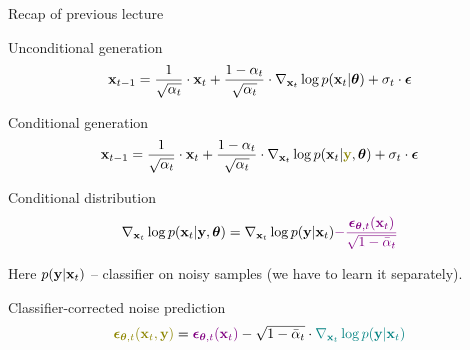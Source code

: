 \begin{frame}{Recap of previous lecture}
	\begin{block}{Unconditional generation}
		\vspace{-0.3cm}
		\[
			\mathbf{x}_{t - 1} = \frac{1}{\sqrt{\alpha_t}} \cdot \mathbf{x}_t + \frac{1 - \alpha_t}{\sqrt{\alpha_t}} \cdot  \nabla_{\mathbf{x}_t} \log p(\mathbf{x}_t | \boldsymbol{\theta}) +  \sigma_t \cdot \boldsymbol{\epsilon}
		\]
		\vspace{-0.5cm}
	\end{block}
	\begin{block}{Conditional generation}
		\vspace{-0.3cm}
		\[
			\bx_{t - 1} = \frac{1}{\sqrt{\alpha_t}} \cdot \bx_t + \frac{1 - \alpha_t}{\sqrt{\alpha_t}} \cdot  \nabla_{\bx_t} \log p(\bx_t | {\color{olive}\by}, \btheta) +  \sigma_t \cdot \bepsilon
		\]
		\vspace{-0.5cm}
	\end{block}
	\begin{block}{Conditional distribution}
		\vspace{-0.3cm}
		\[
			\nabla_{\mathbf{x}_t} \log p(\mathbf{x}_t | \mathbf{y}, \boldsymbol{\theta}) = \nabla_{\mathbf{x}_t} \log p(\mathbf{y} | \mathbf{x}_t) {\color{violet}- \frac{\boldsymbol{\epsilon}_{\boldsymbol{\theta}, t}(\mathbf{x}_t)}{\sqrt{1 - \bar{\alpha}_t}}}
		\]
		\vspace{-0.3cm}
	\end{block}
	Here $p(\mathbf{y} | \mathbf{x}_t)$ -- classifier on noisy samples (we have to learn it separately).
	\begin{block}{Classifier-corrected noise prediction}
		\vspace{-0.3cm}
		\[
			{\color{olive}\bepsilon_{\btheta, t}(\bx_t, \by)} = {\color{violet}\bepsilon_{\btheta, t}(\bx_t)} - \sqrt{1 - \bar{\alpha}_t} \cdot {\color{teal}\nabla_{\bx_t} \log p(\by | \bx_t)}
		\]
	\end{block}
\end{frame}
